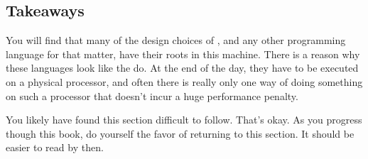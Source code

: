 

\subsection{Takeaways}

You will find that many of the design choices of \csharp, and any other programming language for that matter, have their roots in this machine. There is a reason why these languages look like the do. At the end of the day, they have to be executed on a physical processor, and often there is really only one way of doing something on such a processor that doesn't incur a huge performance penalty.

You likely have found this section difficult to follow. That's okay. As you progress though this book, do yourself the favor of returning to this section. It should be easier to read by then.

